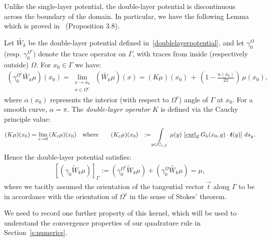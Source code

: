 Unlike the single-layer potential, the double-layer potential is
discontinuous across the boundary of the domain.  In particular, we have
the following Lemma which is proved in~\cite{mit:tay1999} (Proposition
3.8).
\begin{lemma} 
\label{l:DLPjump} 
Let $\widetilde{W_k}$ be the double-layer potential defined
in~\eqref{doublelayerpotential}, and let $\gamma_0^{\Omega}$ (resp.
$\gamma_0^{\Omega^c})$ denote the trace operator on $\Gamma$, with
traces from inside (respectively outside) $\Omega$.  For $x_{0} \in
\Gamma$ we have:
\begin{align*} 
  (\gamma^{\Omega^{c}}_0\widetilde{W_k}\mu)(x_0)=
  \lim\limits_{\substack{x \to x_0 \\ x \in \Omega^{c}}}\, 
  (\widetilde{W_k}\mu)(x) =
  (K\mu)(x_0)\,+\,\left(1-\frac{\alpha(x_0)}{2\pi}\right)\,\mu(x_0),
\end{align*}
where $\alpha(x_{0})$ represents the interior (with respect to
$\Omega^{c}$) angle of $\Gamma$ at $x_{0}$. For a smooth curve, $\alpha
= \pi$. The {\it double-layer operator} $K$ is defined via the Cauchy
principle value: 
\begin{align*}
  (K\mu)(x_0)&=\lim_{\varepsilon\rightarrow 0}
  \, (K_{\varepsilon}\mu)(x_0) \quad \mbox{where}\qquad
  (K_{\varepsilon}\mu)(x_0)&:=\int\limits_{y\in C_{\epsilon,\geq}} 
  \mu(y)\,\left[\underline{\mbox{curl}}_{\S}
  \,G_k(x_{0},y)\cdot\vec{t}(y)\right]\,ds_{y}.
\end{align*}
Hence the double-layer potential satisfies:
\begin{align*}
  \left[(\gamma_0\widetilde W_k\mu) \right]_\Gamma := 
  (\gamma^{\Omega^{c}}_0\widetilde W_k\mu)+(\gamma^{\Omega}_{0} 
  \widetilde{W_k}\mu)=\mu,
\end{align*}
where we tacitly assumed the orientation of the tangential vector
$\vec{t}$ along $\Gamma$ to be in accordance with the orientation of
$\Omega^{c}$ in the sense of Stokes' theorem.

\end{lemma}

We need to record one further property of this kernel, which will be
used to understand the convergence properties of our quadrature rule in
Section~\ref{s:numerics}.


